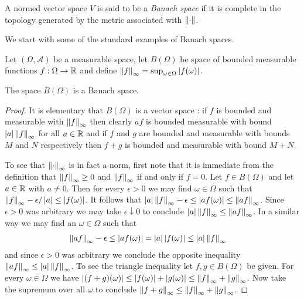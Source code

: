 \begin{defn}A normed vector space $V$ is said to be a \emph{Banach space} if it is complete in the topology generated by the metric associated with $\left \lVert \cdot \right \rVert$.
\end{defn}
We start with some of the standard examples of Banach spaces.

\begin{defn}Let $(\Omega, \mathcal{A})$ be a measurable space, let $B(\Omega)$ be space of bounded measurable functions $f : \Omega \to \mathbb{R}$ and define $\left \lVert f \right \rVert_\infty = \sup_{\omega \in \Omega} \left \vert f(\omega) \right \vert$.
\end{defn}

\begin{prop}The space $B(\Omega)$ is a Banach space.
\end{prop}
\begin{proof}
It is elementary that $B(\Omega)$ is a vector space : if $f$ is bounded and measurable with $\left \lVert f \right \rVert_\infty$ then clearly $af$ is bounded measurable with bound $\left \vert a \right \vert\left \lVert f \right \rVert_\infty$ for all $a \in \mathbb{R}$ and if $f$ and $g$ are bounded and measurable with bounds $M$ and $N$ respectively then $f+g$ is bounded and measurable with bound $M+N$.

To see that $\left \lVert \cdot \right \rVert_\infty$ is in fact a norm, first note that it is immediate from the definition that $\left \lVert f \right \rVert_\infty \geq 0$ and $\left \lVert f \right \rVert_\infty$ if and only if $f = 0$.  Let $f \in B(\Omega)$ and let $a \in \mathbb{R}$ with $a \neq 0$.  Then for every $\epsilon>0$ we may find $\omega \in \Omega$ such that $\left \lVert f \right \rVert_\infty - \epsilon/\left \vert a \right \vert \leq \left \vert f(\omega) \right \vert$.  It follows that $\left \vert a \right \vert \left \lVert f \right \rVert_\infty - \epsilon \leq \left \vert a f (\omega) \right \vert \leq \left \lVert af \right \rVert_\infty$.  Since $\epsilon >0$  was arbitrary we may take $\epsilon \downarrow 0$ to conclude $\left \vert a \right \vert \left \lVert f \right \rVert_\infty \leq \left \lVert af \right \rVert_\infty$.  In a similar way we may find an $\omega \in \Omega$ such that 
\begin{align*}
\left \lVert af \right \rVert_\infty - \epsilon &\leq \left \vert af(\omega) \right \vert = \left \vert a \right \vert\left \vert f(\omega) \right \vert \leq \left \vert a \right \vert \left \lVert f \right \rVert_\infty
\end{align*}
and since $\epsilon > 0$ was arbitrary we conclude the opposite inequality $\left \lVert af \right \rVert_\infty \leq \left \vert a \right \vert \left \lVert f \right \rVert_\infty$.  To see the triangle inequality let $f, g \in B(\Omega)$ be given.  For every $\omega \in \Omega$ we have $\left \vert (f+g)(\omega) \right \vert \leq \left \vert f(\omega) \right \vert+\left \vert g(\omega) \right \vert \leq \left \lVert f \right \rVert_\infty + \left \lVert g \right \rVert_\infty$.  Now take the supremum over all $\omega$ to conclude $\left \lVert f+g \right \rVert_\infty \leq \left \lVert f \right \rVert_\infty + \left \lVert g \right \rVert_\infty$.


\end{proof}
